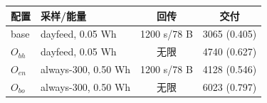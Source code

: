 \begin{tabular}{llcc}
\toprule
配置 & 采样/能量 & 回传 & 交付\\
\midrule
base & dayfeed, 0.05 Wh & 1200 s/78 B & 3065 (0.405)\\
$O_{bh}$ & dayfeed, 0.05 Wh & 无限 & 4740 (0.627)\\
$O_{en}$ & always-300, 0.50 Wh & 1200 s/78 B & 4128 (0.546)\\
$O_{bo}$ & always-300, 0.50 Wh & 无限 & 6023 (0.797)\\
\bottomrule
\end{tabular}
